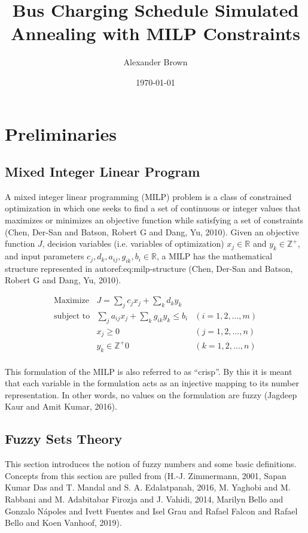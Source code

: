 \documentclass[11pt,a4paper,final]{article}
\author{Alexander Brown}
\date{\today}
\title{Bus Charging Schedule Simulated Annealing with MILP Constraints}
\begin{document}
\maketitle
\tableofcontents


\section{Preliminaries}
\label{sec:org67d644d}
\subsection{Mixed Integer Linear Program}
\label{sec:org1e7ac49}
A mixed integer linear programming (MILP) problem is a class of constrained optimization in which one seeks to find a
set of continuous or integer values that maximizes or minimizes an objective function while satisfying a set of
constraints (Chen, Der-San and Batson, Robert G and Dang, Yu, 2010). Given an objective function \(J\), decision variables (i.e. variables of
optimization) \(x_j \in \mathbb{R}\) and \(y_k \in \mathbb{Z}^+\), and input parameters \(c_j, d_k, a_{ij}, g_{ik}, b_i \in \mathbb{R}\), a MILP has the
mathematical structure represented in autoref:eq:milp-structure (Chen, Der-San and Batson, Robert G and Dang, Yu, 2010).

\begin{equation}
\label{eq:milp-structure}
\begin{array}{lll}
\text{Maximize}   & J = \sum_j c_j x_j + \sum_k d_k y_k            &                 \\
\text{subject to} & \sum_j a_{ij} x_j + \sum_k g_{ik} y_k  \le b_i & (i = 1,2,...,m) \\
                  & x_j \ge 0                                      & (j = 1,2,...,n) \\
                  & y_k \in \mathbb{Z^+}0                          & (k = 1,2,...,n) \\
\end{array}
\end{equation}

This formulation of the MILP is also referred to as ``crisp''. By this it is meant that each variable in the formulation
acts as an injective mapping to its number representation. In other words, no values on the formulation are fuzzy
(Jagdeep Kaur and Amit Kumar, 2016).

\subsection{Fuzzy Sets Theory}
\label{sec:org71bd545}
This section introduces the notion of fuzzy numbers and some basic definitions. Concepts from this section are pulled
from (H.-J. Zimmermann, 2001, Sapan Kumar Das and T. Mandal and S. A. Edalatpanah, 2016, M. Yaghobi and M. Rabbani and M. Adabitabar Firozja and J. Vahidi, 2014, Marilyn Bello and Gonzalo N{\'a}poles and Ivett Fuentes and Isel Grau and Rafael Falcon and Rafael Bello and Koen Vanhoof, 2019).
\end{document}
